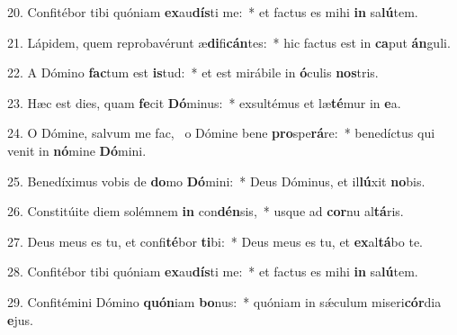20. Confitébor tibi quóniam \textbf{ex}au\textbf{dís}ti me:~*  et factus es mihi \textbf{in} sa\textbf{lú}tem.\

21. Lápidem, quem reprobavérunt æ\textbf{di}fi\textbf{cán}tes:~*  hic factus est in \textbf{ca}put \textbf{án}guli.\

22. A Dómino \textbf{fac}tum est \textbf{is}tud:~*  et est mirábile in \textbf{ó}culis \textbf{nos}tris.\

23. Hæc est dies, quam \textbf{fe}cit \textbf{Dó}minus:~*  exsultémus et læ\textbf{té}mur in \textbf{e}a.\

24. O Dómine, salvum me fac, \dag\  o Dómine bene \textbf{pro}spe\textbf{rá}re:~*  benedíctus qui venit in \textbf{nó}mine \textbf{Dó}mini.\

25. Benedíximus vobis de \textbf{do}mo \textbf{Dó}mini:~*  Deus Dóminus, et il\textbf{lú}xit \textbf{no}bis.\

26. Constitúite diem solémnem \textbf{in} con\textbf{dén}sis,~*  usque ad \textbf{cor}nu al\textbf{tá}ris.\

27. Deus meus es tu, et confi\textbf{té}bor \textbf{ti}bi:~*  Deus meus es tu, et \textbf{ex}al\textbf{tá}bo te.\

28. Confitébor tibi quóniam \textbf{ex}au\textbf{dís}ti me:~*  et factus es mihi \textbf{in} sa\textbf{lú}tem.\

29. Confitémini Dómino \textbf{quón}iam \textbf{bo}nus:~*  quóniam in sǽculum miseri\textbf{cór}dia \textbf{e}jus.\


